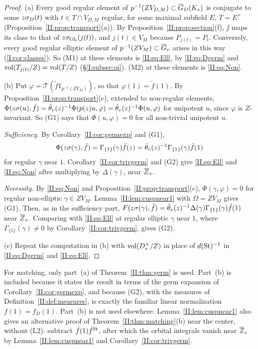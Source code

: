 \begin{proof}
(a) Every good regular element of $p^{-1}(ZV_{D,M})\subset\overline{G}_D(K_v)$ is conjugate to some $z\sigma_D(t)$ with $t\in T\cap V_{D,M}$ regular, for some maximal subfield $E$, $T=E^\times$ (Proposition~\ref{II:prop:transport}(a)). By Proposition~\ref{II:prop:section}(f), $\jj$ maps its class to that of $z\sigma_{\mathrm{GL}}(j(t))$, and $j(t)\in V_M$ because $P_{j(t)}=P_t$. Conversely, every good regular elliptic element of $p^{-1}(ZV_M)\subset\overline{G}_v$ arises in this way (\cref{I:cor:classes}). So (M1) at these elements is \eqref{II:eq:Ell}, by \eqref{II:eq:Dgerm} and $\operatorname{vol}(T_{j(t)}/Z)=\operatorname{vol}(T/Z)$ (\S\ref{I:subsec:oi}). (M2) at these elements is \eqref{II:eq:Non}.

(b) Put $\varphi=\mathcal T(\tilde f1_{p^{-1}(ZV_M)})$, so that $\varphi(1)=\tilde f(1)$. By Proposition~\ref{II:prop:transport}(c), extended to non-regular elements, $\Phi(z\sigma(u),\tilde f)=\tilde\theta_v(z)^{-1}\Phi(p(z)u,\varphi)=\tilde\theta_v(z)^{-1}\Phi(u,\varphi)$ for unipotent $u$, since $\varphi$ is $Z$-invariant. So (G1) says that $\Phi(u,\varphi)=0$ for all non-trivial unipotent $u$.

\emph{Sufficiency.} By Corollary~\ref{II:cor:germexp} and (G1), \[ \Phi(z\sigma(\gamma),\tilde f)=\Gamma_{\{1\}}(\gamma)\tilde f(z)=\tilde\theta_v(z)^{-1}\Gamma_{\{1\}}(\gamma)\tilde f(1) \]
for regular $\gamma$ near $1$. Corollary~\ref{II:cor:trivgerm} and (G2) give \eqref{II:eq:Ell} and \eqref{II:eq:Non} after multiplying by $\Delta(\gamma)$, near $\overline{Z}_v$.

\emph{Necessity.} By \eqref{II:eq:Non} and Proposition~\ref{II:prop:transport}(c), $\Phi(\gamma,\varphi)=0$ for regular non-elliptic $\gamma\in ZV_M$. Lemma~\ref{II:lem:cuspnear1} with $\Omega=ZV_M$ gives (G1). Then, as in the sufficiency part, $F(z\sigma(\gamma),\tilde f)=\tilde\theta_v(z)^{-1}\Delta(\gamma)\Gamma_{\{1\}}(\gamma)\tilde f(1)$ near $\overline{Z}_v$. Comparing with \eqref{II:eq:Ell} at regular elliptic $\gamma$ near $1$, where $\Gamma_{\{1\}}(\gamma)\ne0$ by Corollary~\ref{II:cor:trivgerm}, gives (G2).

(c) Repeat the computation in (b) with $\operatorname{vol}(D_v^\times/Z)$ in place of $d(\mathrm{St})^{-1}$ in \eqref{II:eq:Dgerm} and \eqref{II:eq:Ell}.
\end{proof}

\begin{remark}
For matching, only part~(a) of Theorem~\ref{II:thm:germ} is used. Part~(b) is included because it states the result in terms of the germ expansion of Corollary~\ref{II:cor:germexp}, and because (G2), with the measures of Definition~\ref{II:def:measures}, is exactly the familiar linear normalization $f(1)=f_D(1)$. Part~(b) is not used elsewhere. Lemma~\ref{II:lem:cuspnear1} also gives an alternative proof of Theorem~\ref{II:thm:matching}(b) near the center, without (L2): subtract $\tilde f(1)\tilde f^{\mathrm{St}}$, after which the orbital integrals vanish near $\overline{Z}_v$ by Lemma~\ref{II:lem:cuspnear1} and Corollary~\ref{II:cor:trivgerm}.
\end{remark}


